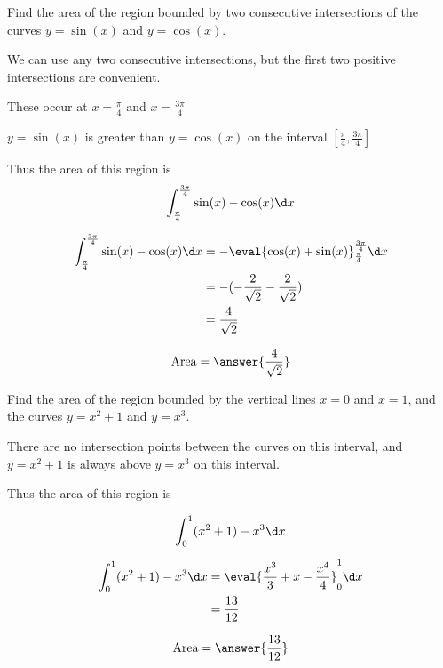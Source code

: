 \documentclass[handout]{ximera}
\begin{document}
\begin{exercise}
Find the area of the region bounded by two consecutive intersections of the curves $y=\sin(x)$ and $y = \cos(x)$.

\begin{hint}
  We can use any two consecutive intersections, but the first two positive intersections are convenient.

  These occur at $x = \frac{\pi}{4}$ and $x = \frac{3\pi}{4}$
\end{hint}

\begin{hint}
  $y = \sin(x)$ is greater than $y=\cos(x)$ on the interval $[\frac{\pi}{4},\frac{3\pi}{4}]$
\end{hint}

\begin{hint}
	Thus the area of this region is
	\[
	\int_{\frac{\pi}{4}}^{\frac{3\pi}{4}} \sin(x) - \cos(x) \d x
	\]
\end{hint}

\begin{hint}
  \begin{align*}
	  \int_{\frac{\pi}{4}}^{\frac{3\pi}{4}} \sin(x) - \cos(x) \d x &=  -\eval{\cos(x)+\sin(x)}_{\frac{\pi}{4}}^{\frac{3\pi}{4}}  \d x\\
		&=-(-\frac{2}{\sqrt{2}} - \frac{2}{\sqrt{2}})\\
		&= \frac{4}{\sqrt{2}}
	\end{align*}
\end{hint}

\begin{prompt}
  \[
  \textrm{Area} = \answer{\frac{4}{\sqrt{2}}}
  \]
\end{prompt}

\end{exercise}

\begin{exercise}
Find the area of the region bounded by the vertical lines $x=0$ and $x=1$, and the curves $y = x^2+1$ and $y = x^3$.

\begin{hint}
	There are no intersection points between the curves on this interval, and $y = x^2+1$ is always above $y=x^3$ on this interval.
\end{hint}


\begin{hint}
	Thus the area of this region is

	\[
	\int_{0}^{1} (x^2+1)-x^3 \d x
	\]
\end{hint}

\begin{hint}
	\begin{align*}
		\int_{0}^{1} (x^2+1)-x^3 \d x &=  \eval{\frac{x^3}{3}+x-\frac{x^4}{4}}_0^1  \d x\\
		&= \frac{13}{12}
	\end{align*}
\end{hint}

\begin{prompt}
	\[
		\textrm{Area} = \answer{\frac{13}{12}}
	\]
\end{prompt}

\end{exercise}
\end{document}
